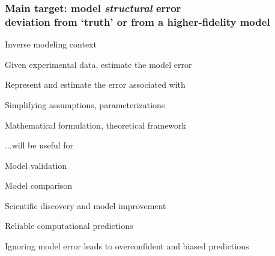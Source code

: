 
\begin{frame}[t]
\label{motivation}

\frametitle{Main target: model \emph{structural} error \\ \small{ deviation from `truth' or from a higher-fidelity model}}

\bi
\item Inverse modeling context
\bi
\item Given experimental data, estimate the model error
\ei
\medskip

\medskip
\item Represent and estimate the error associated with
\bi
\item Simplifying assumptions, parameterizations
\item Mathematical formulation, theoretical framework
\ei
\medskip
\item ...will be useful for
\bi
\item Model validation
\item Model comparison
\item Scientific discovery and model improvement
\item Reliable computational predictions
\ei

\item Ignoring model error leads to overconfident and biased predictions

\ei

\vspace*{-6cm}
\hspace*{10cm}

\end{frame}


